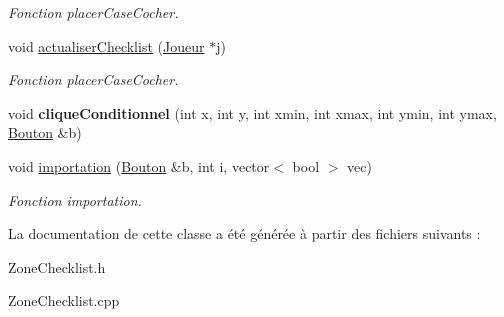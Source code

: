 \begin{DoxyCompactItemize}
\begin{DoxyCompactList}\small\item\em \-Fonction placer\-Case\-Cocher. \end{DoxyCompactList}\item 
\hypertarget{classZoneChecklist_a2d22b4546f136a703da6fb0c6b8c0dcb}{void \hyperlink{classZoneChecklist_a2d22b4546f136a703da6fb0c6b8c0dcb}{actualiser\-Checklist} (\hyperlink{classJoueur}{\-Joueur} $\ast$j)}\label{classZoneChecklist_a2d22b4546f136a703da6fb0c6b8c0dcb}

\begin{DoxyCompactList}\small\item\em \-Fonction placer\-Case\-Cocher. \end{DoxyCompactList}\item 
\hypertarget{classZoneChecklist_a131c733dca0597e4b8a4e24303dc0f25}{void {\bfseries clique\-Conditionnel} (int x, int y, int xmin, int xmax, int ymin, int ymax, \hyperlink{classBouton}{\-Bouton} \&b)}\label{classZoneChecklist_a131c733dca0597e4b8a4e24303dc0f25}

\item 
\hypertarget{classZoneChecklist_ab6600a57c75090d99f2efad6b66a5a93}{void \hyperlink{classZoneChecklist_ab6600a57c75090d99f2efad6b66a5a93}{importation} (\hyperlink{classBouton}{\-Bouton} \&b, int i, vector$<$ bool $>$ vec)}\label{classZoneChecklist_ab6600a57c75090d99f2efad6b66a5a93}

\begin{DoxyCompactList}\small\item\em \-Fonction importation. \end{DoxyCompactList}\end{DoxyCompactItemize}


\-La documentation de cette classe a été générée à partir des fichiers suivants \-:\begin{DoxyCompactItemize}
\item 
\-Zone\-Checklist.\-h\item 
\-Zone\-Checklist.\-cpp\end{DoxyCompactItemize}
